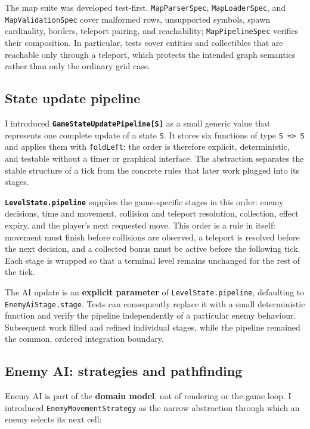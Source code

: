 The map suite was developed test-first. \texttt{MapParserSpec}, \texttt{MapLoaderSpec}, and
\texttt{MapValidationSpec} cover malformed rows, unsupported symbols, spawn cardinality, borders, teleport pairing,
and reachability; \texttt{MapPipelineSpec} verifies their composition. In particular, tests cover entities and
collectibles that are reachable only through a teleport, which protects the intended graph semantics rather than
only the ordinary grid case.

\subsection{State update pipeline}

I introduced \textbf{\texttt{GameStateUpdatePipeline[S]}} as a small generic value that represents one complete update of a
state \texttt{S}. It stores six functions of type \texttt{S => S} and applies them with \texttt{foldLeft}; the order is
therefore explicit, deterministic, and testable without a timer or graphical interface. The abstraction separates the
stable structure of a tick from the concrete rules that later work plugged into its stages.

\textbf{\texttt{LevelState.pipeline}} supplies the game-specific stages in this order: enemy decisions, time and movement,
collision and teleport resolution, collection, effect expiry, and the player's next requested move. This order is a
rule in itself: movement must finish before collisions are observed, a teleport is resolved before the next decision,
and a collected bonus must be active before the following tick. Each stage is wrapped so that a terminal level remains
unchanged for the rest of the tick.

The AI update is an \textbf{explicit parameter} of \texttt{LevelState.pipeline}, defaulting to
\texttt{EnemyAiStage.stage}. Tests can consequently replace it with a small deterministic function and verify the
pipeline independently of a particular enemy behaviour. Subsequent work filled and refined individual stages, while
the pipeline remained the common, ordered integration boundary.

\subsection{Enemy AI: strategies and pathfinding}

Enemy AI is part of the \textbf{domain model}, not of rendering or the game loop. I introduced
\texttt{EnemyMovementStrategy} as the narrow abstraction through which an enemy selects its next cell:

